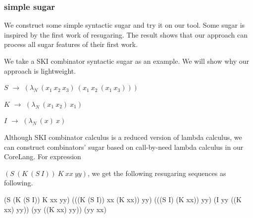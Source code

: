 \subsubsection{simple sugar}
\label{mark:simple}

We construct some simple syntactic sugar and try it on our tool. Some sugar is inspired by the first work of resugaring\cite{resugaring}. The result shows that our approach can process all sugar features of their first work.

We take a SKI combinator syntactic sugar as an example. We will show why our approach is lightweight.

\begin{flushleft}
	$S$ $\rightarrow$ $(\lambda _{N}~(x_{1}~x_{2}~x_{3})~(x_{1}~x_{2}~(x_{1}~x_{3})))$

	$K$ $\rightarrow$ $(\lambda _{N}~(x_{1}~x_{2})~x_{1})$

	$I$ $\rightarrow$ $(\lambda _{N}~(x)~x)$
\end{flushleft}

Although SKI combinator calculus is a reduced version of lambda calculus, we can construct combinators' sugar based on call-by-need lambda calculus in our CoreLang. For expression

 $(S~(K~(S~I))~K~xx~yy)$, we get the following resugaring sequences as following.
\begin{Codes}
    (S (K (S I)) K xx yy)
\CoreStep (((K (S I)) xx (K xx)) yy)
\CoreStep (((S I) (K xx)) yy)
\CoreStep (I yy ((K xx) yy))
\CoreStep (yy ((K xx) yy))
\CoreStep (yy xx)
\end{Codes}

